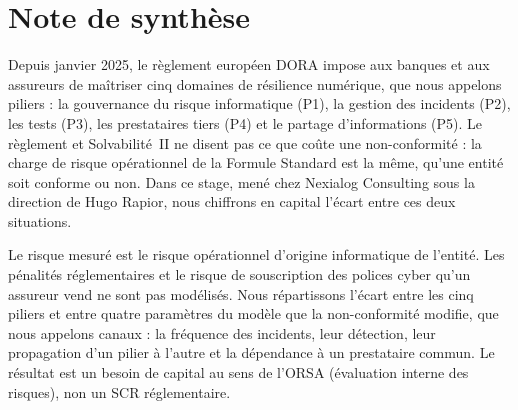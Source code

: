 %

\providecommand*{\notesec}[1]{\par\smallskip\noindent{\bfseries #1}\par}

\chapter*{Note de synthèse}


\notesec{Contexte et objectif}
Depuis janvier 2025, le règlement européen DORA impose aux banques et aux assureurs de maîtriser
cinq domaines de résilience numérique, que nous appelons piliers : la gouvernance du risque
informatique (P1), la gestion des incidents (P2), les tests (P3), les prestataires tiers (P4) et le
partage d'informations (P5). Le règlement et Solvabilité~II ne disent pas ce que coûte une non-conformité : la charge de risque opérationnel de la Formule Standard est la même, qu'une entité soit conforme ou non. Dans ce stage, mené chez Nexialog
Consulting sous la direction de Hugo Rapior, nous chiffrons en capital l'écart entre ces deux
situations.

Le risque mesuré est le risque opérationnel d'origine informatique de l'entité. Les pénalités réglementaires et le risque de souscription des polices cyber
qu'un assureur vend ne sont pas modélisés. Nous répartissons l'écart entre les cinq piliers et entre
quatre paramètres du modèle que la non-conformité modifie, que nous appelons canaux : la fréquence
des incidents, leur détection, leur propagation d'un pilier à l'autre et la dépendance à un
prestataire commun. Le résultat est un besoin de capital au sens de l'ORSA (évaluation interne des risques), non un SCR réglementaire.

